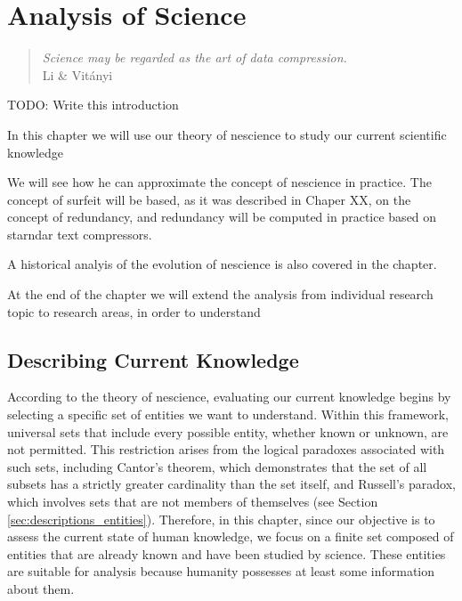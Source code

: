 %
%


\chapter{Analysis of Science}
\label{chap:philosophy-science}

\begin{quote}
\begin{flushright}
\emph{Science may be regarded as the art of data compression.}\\
Li \& Vitányi
\end{flushright}
\end{quote}
\bigskip

{\color{red} TODO: Write this introduction}

In this chapter we will use our theory of nescience to study our current scientific knowledge

We will see how he can approximate the concept of nescience in practice. The concept of surfeit will be based, as it was described in Chaper XX, on the concept of redundancy, and redundancy will be computed in practice based on starndar text compressors.

A historical analyis of the evolution of nescience is also covered in the chapter.

At the end of the chapter we will extend the analysis from individual research topic to research areas, in order to understand 

%
%
\section{Describing Current Knowledge}

According to the theory of nescience, evaluating our current knowledge begins by selecting a specific set of entities we want to understand. Within this framework, universal sets that include every possible entity, whether known or unknown, are not permitted. This restriction arises from the logical paradoxes associated with such sets, including Cantor's theorem, which demonstrates that the set of all subsets has a strictly greater cardinality than the set itself, and Russell's paradox, which involves sets that are not members of themselves (see Section \ref{sec:descriptions_entities}). Therefore, in this chapter, since our objective is to assess the current state of human knowledge, we focus on a finite set composed of entities that are already known and have been studied by science. These entities are suitable for analysis because humanity possesses at least some information about them.

